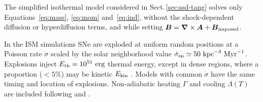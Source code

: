 \documentclass[preprint2]{aastex63}
\newcommand\SNr{\dot\sigma_{\rm sn}}
\newcommand\ESK{E_{\rm kin}}
\newcommand\EST{E_{\rm th}}
\newcommand{\vect}[1]{{{\mbox{\boldmath $#1$}}}}%
\newcommand\kpc{~ {\rm kpc}}
\newcommand\Myr{~ {\rm Myr}}
\newcommand\erg{~ {\rm erg}}
\begin{document}
 {The simplified isothermal model considered in
Sect.\,\ref{sec:ssd-tang} solves only Equations~{\eqref{eq:mass},}
 \eqref{eq:mom} and~\eqref{eq:ind}, without the shock-dependent diffusion or
 hyperdiffusion terms, and while setting
 $\vect{B}=\vect\nabla\times\vect{A}+\vect{B}_{\rm imposed}$.}

 {In the ISM simulations} SNe are exploded at {uniform} random positions
 at a Poisson rate $\dot\sigma$ {scaled by} the solar neighborhood
 value $\SNr\simeq 50\kpc^{-3}\Myr^{-1}$.
 Explosions inject $\EST = 10^{51}\erg$ thermal energy, except in
 dense regions, where a proportion {($<5\%$) may be} kinetic $\ESK$ 
 \citep[see][]{GMKSH20}.
 {Models with common $\dot\sigma$ have the same timing and location of
 explosions.}
 Non-adiabatic heating $\Gamma$ and cooling $\Lambda (T)$ are included
 \citep{Gent:2013b} following \citet{Wolfire:1995} and \citet{Sarazin:1987}.
\end{document}
